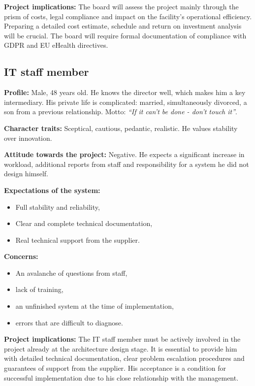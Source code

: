 \textbf{Project implications:} The board will assess the project mainly through the prism of costs, legal compliance and impact on the facility's operational efficiency. Preparing a detailed cost estimate, schedule and return on investment analysis will be crucial. The board will require formal documentation of compliance with GDPR and EU eHealth directives.

\subsection{IT staff member}

\textbf{Profile:} Male, 48 years old. He knows the director well, which makes him a key intermediary. His private life is complicated: married, simultaneously divorced, a son from a previous relationship. Motto: \emph{``If it can't be done - don't touch it''}.

\textbf{Character traits:} Sceptical, cautious, pedantic, realistic. He values stability over innovation.

\textbf{Attitude towards the project:} Negative. He expects a significant increase in workload, additional reports from staff and responsibility for a system he did not design himself.

\textbf{Expectations of the system:}
\begin{itemize}
    \item Full stability and reliability,
    \item Clear and complete technical documentation,
    \item Real technical support from the supplier.
\end{itemize}


\textbf{Concerns:}
\begin{itemize}
    \item An avalanche of questions from staff,
    \item lack of training,
    \item an unfinished system at the time of implementation,
    \item errors that are difficult to diagnose.
\end{itemize}

\textbf{Project implications:} The IT staff member must be actively involved in the project already at the architecture design stage. It is essential to provide him with detailed technical documentation, clear problem escalation procedures and guarantees of support from the supplier. His acceptance is a condition for successful implementation due to his close relationship with the management.

